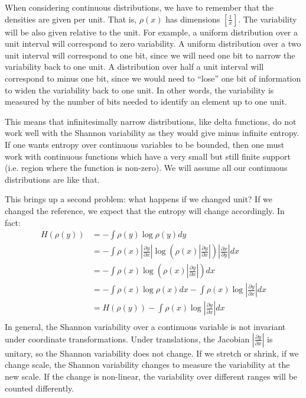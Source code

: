 \documentclass{article}
\begin{document}
When considering continuous distributions, we have to remember that the densities are given per unit. That is, $\rho(x)$ has dimensions $[\frac{1}{x}]$. The variability will be also given relative to the unit. For example, a uniform distribution over a unit interval will correspond to zero variability. A uniform distribution over a two unit interval will correspond to one bit, since we will need one bit to narrow the variability back to one unit. A distribution over half a unit interval will correspond to minus one bit, since we would need to ``lose'' one bit of information to widen the variability back to one unit. In other words, the variability is measured by the number of bits needed to identify an element up to one unit.

This means that infinitesimally narrow distributions, like delta functions, do not work well with the Shannon variability as they would give minus infinite entropy. If one wants entropy over continuous variables to be bounded, then one must work with continuous functions which have a very small but still finite support (i.e. region where the function is non-zero). We will assume all our continuous distributions are like that.

This brings up a second problem: what happens if we changed unit? If we changed the reference, we expect that the entropy will change accordingly. In fact:
\begin{equation}
\begin{aligned}
H(\rho(y)) &= - \int \rho(y) \log \rho(y) dy \\
&= - \int \rho(x) \left|\frac{\partial y}{\partial x}\right| \log \left(\rho(x)\left|\frac{\partial y}{\partial x}\right| \right) \left|\frac{\partial x}{\partial y}\right| dx \\
&= - \int \rho(x)  \log \left(\rho(x)\left|\frac{\partial y}{\partial x}\right| \right)  dx \\
&= - \int \rho(x)  \log \rho(x)  dx - \int \rho(x)  \log \left|\frac{\partial y}{\partial x}\right|  dx \\
&= H(\rho(y)) - \int \rho(x)  \log \left|\frac{\partial y}{\partial x}\right|  dx \\
\end{aligned}
\end{equation}
In general, the Shannon variability over a continuous variable is not invariant under coordinate transformations. Under translations, the Jacobian $\left|\frac{\partial y}{\partial x}\right|$ is unitary, so the Shannon variability does not change. If we stretch or shrink, if we change scale, the Shannon variability changes to measure the variability at the new scale. If the change is non-linear, the variability over different ranges will be counted differently.
\end{document}
